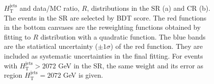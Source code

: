 \begin{figure}[H]
  \caption{$H_{\text{T}}^{\text{jets}}$ and data/MC ratio, $R$, distributions in the SR (a) and CR (b). The events in the SR are selected by BDT score. The red functions in the bottom canvases are the reweighting functions obtained by fitting to $R$ distribution with a quadratic function. The blue bands are the statistical uncertainty (${\pm}1{\sigma}$) of the red function. They are included as systematic uncertainties in the final fitting. For events with $H_{\text{T}}^{\text{jets}}>2072$ GeV in the SR, the same weight and its error as region $H_{\text{T}}^{\text{jets}}=2072$ GeV is given. }
  \label{fig:RWFactors_HTjets}
\end{figure}


